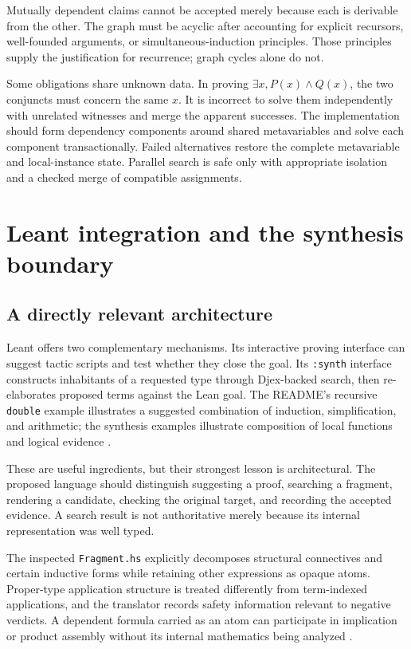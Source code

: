 \documentclass[11pt,a4paper]{article}
\newcommand{\codeid}[1]{\nolinkurl{#1}}
\begin{document}
Mutually dependent claims cannot be accepted merely because each is derivable from the other. The graph must be acyclic after accounting for explicit recursors, well-founded arguments, or simultaneous-induction principles. Those principles supply the justification for recurrence; graph cycles alone do not.

Some obligations share unknown data. In proving $\exists x,P(x)\land Q(x)$, the two conjuncts must concern the same $x$. It is incorrect to solve them independently with unrelated witnesses and merge the apparent successes. The implementation should form dependency components around shared metavariables and solve each component transactionally. Failed alternatives restore the complete metavariable and local-instance state. Parallel search is safe only with appropriate isolation and a checked merge of compatible assignments.

\section{Leant integration and the synthesis boundary}
\label{sec:leant}

\subsection{A directly relevant architecture}

Leant offers two complementary mechanisms. Its interactive proving interface can suggest tactic scripts and test whether they close the goal. Its \codeid{:synth} interface constructs inhabitants of a requested type through Djex-backed search, then re-elaborates proposed terms against the Lean goal. The README's recursive \codeid{double} example illustrates a suggested combination of induction, simplification, and arithmetic; the synthesis examples illustrate composition of local functions and logical evidence \cite{leantreadme}.

These are useful ingredients, but their strongest lesson is architectural. The proposed language should distinguish suggesting a proof, searching a fragment, rendering a candidate, checking the original target, and recording the accepted evidence. A search result is not authoritative merely because its internal representation was well typed.

The inspected \codeid{Fragment.hs} explicitly decomposes structural connectives and certain inductive forms while retaining other expressions as opaque atoms. Proper-type application structure is treated differently from term-indexed applications, and the translator records safety information relevant to negative verdicts. A dependent formula carried as an atom can participate in implication or product assembly without its internal mathematics being analyzed \cite{leantfragment}.
\end{document}
